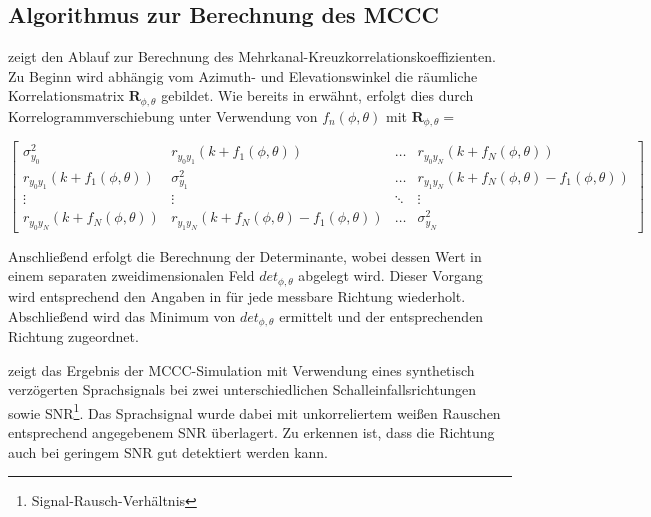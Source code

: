 \subsection{Algorithmus zur Berechnung des MCCC}
 zeigt den Ablauf zur Berechnung des Mehrkanal-Kreuzkorrelationskoeffizienten. Zu Beginn wird abhängig vom Azimuth- und Elevationswinkel die räumliche Korrelationsmatrix  $\mathbf{R}_{\phi,\theta}$ gebildet. Wie bereits in  erwähnt, erfolgt dies durch Korrelogrammverschiebung unter Verwendung von $f_n(\phi, \theta)$ mit $\mathbf{R}_{\phi,\theta}=$

\begin{equation}
    \begin{bmatrix}
    \sigma_{y_0}^2	     & r_{y_0 y_1}(k + f_1(\phi,\theta))     & \dots & r_{y_0 y_N}(k + f_N(\phi,\theta))       \\
    r_{y_0 y_1}(k + f_1(\phi,\theta))	  & \sigma_{y_1}^2      & \dots & r_{y_1 y_N}(k + f_N(\phi,\theta) - f_1(\phi,\theta))        \\
    \vdots	            & \vdots 	           & \ddots & \vdots                \\
    r_{y_0 y_N}(k + f_N(\phi,\theta))	  & r_{y_1 y_N}(k + f_N(\phi,\theta) - f_1(\phi,\theta))     & \dots	 & \sigma_{y_N}^2
    \end{bmatrix}
\end{equation}



Anschließend erfolgt die Berechnung der Determinante, wobei dessen Wert in einem separaten zweidimensionalen Feld $det_{\phi, \theta}$ abgelegt wird. Dieser Vorgang wird entsprechend den Angaben in  für jede messbare Richtung wiederholt. Abschließend wird das Minimum von $det_{\phi, \theta}$ ermittelt und der entsprechenden Richtung zugeordnet.

 zeigt das Ergebnis der MCCC-Simulation mit Verwendung eines synthetisch verzögerten Sprachsignals bei zwei unterschiedlichen Schalleinfallsrichtungen sowie SNR\footnote{Signal-Rausch-Verhältnis}. Das Sprachsignal wurde dabei mit unkorreliertem weißen Rauschen entsprechend angegebenem SNR überlagert. Zu erkennen ist, dass die Richtung auch bei geringem SNR gut detektiert werden kann.




